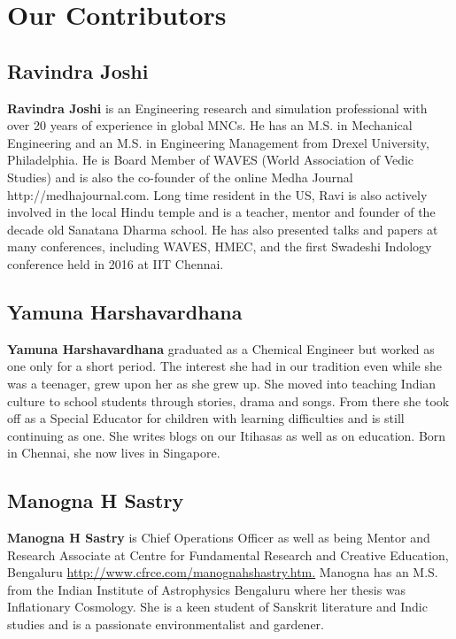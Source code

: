 
\chapter*{Our Contributors }\label{contributors}

\section*{Ravindra Joshi}

\textbf{Ravindra Joshi} is an Engineering research and simulation professional with over 20 years of experience in global MNCs. He has an M.S. in Mechanical Engineering and an M.S. in Engineering Management from Drexel University, Philadelphia. He is Board Member of WAVES (World Association of Vedic Studies) and is also the co-founder of the online Medha Journal http://medhajournal.com. Long time resident in the US, Ravi is also actively involved in the local Hindu temple and is a teacher, mentor and founder of the decade old Sanatana Dharma school. He has also presented talks and papers at many conferences, including WAVES, HMEC, and the first Swadeshi Indology conference held in 2016 at IIT Chennai.

\section*{Yamuna Harshavardhana}

\textbf{Yamuna Harshavardhana} graduated as a Chemical Engineer but worked as one only for a short period. The interest she had in our tradition even while she was a teenager, grew upon her as she grew up. She moved into teaching Indian culture to school students through stories, drama and songs. From there she took off as a Special Educator for children with learning difficulties and is still continuing as one. She writes blogs on our Itihasas as well as on education. Born in Chennai, she now lives in Singapore.

\newpage

\section*{Manogna H Sastry}

\textbf{Manogna H Sastry} is Chief Operations Officer as well as being Mentor and Research Associate at Centre for Fundamental Research and Creative Education, Bengaluru \url{http://www.cfrce.com/manognahshastry.htm.} Manogna has an M.S. from the Indian Institute of Astrophysics Bengaluru where her thesis was Inflationary Cosmology. She is a keen student of Sanskrit literature and Indic studies and is a passionate environmentalist and gardener.

